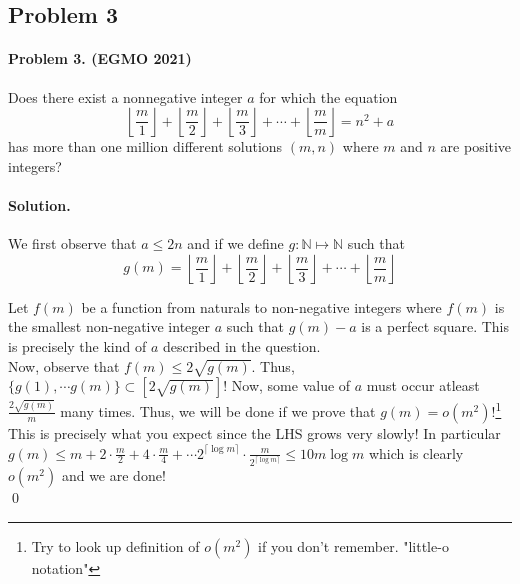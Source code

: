 \documentclass[12pt]{article}
\newenvironment{solution}
{\paragraph{Solution.}}
{\qed\eject}
\newcommand*{\NN}{\mathbb{N}}
\begin{document}
\subsection*{Problem 3}

\paragraph*{\textbf{Problem 3. (EGMO 2021)}} Does there exist a nonnegative integer $a$ for which the equation
\[\left\lfloor\frac{m}{1}\right\rfloor + \left\lfloor\frac{m}{2}\right\rfloor + \left\lfloor\frac{m}{3}\right\rfloor + \cdots + \left\lfloor\frac{m}{m}\right\rfloor = n^2 + a\]has more than one million different solutions $(m, n)$ where $m$ and $n$ are positive integers?

\begin{solution}
    We first observe that $a\le 2n$ and if we define $g:\NN\mapsto \NN$ such that \[g(m)=\left\lfloor\frac{m}{1}\right\rfloor + \left\lfloor\frac{m}{2}\right\rfloor + \left\lfloor\frac{m}{3}\right\rfloor + \cdots + \left\lfloor\frac{m}{m}\right\rfloor\]

    Let $f(m)$ be a function from naturals to non-negative integers where $f(m)$ is the smallest non-negative integer $a$ such that $g(m)-a$ is a perfect square. This is precisely the kind of $a$ described in the question.\\

    Now, observe that $f(m)\le 2\sqrt{g(m)}$. Thus, $\{g(1),\cdots g(m)\} \subset [2\sqrt{g(m)}]$! Now, some value of $a$ must occur atleast $\frac{2\sqrt{g(m)}}{m}$ many times. Thus, we will be done if we prove that $g(m)=o(m^2)$!\footnote{Try to look up definition of $o(m^2)$ if you don't remember. "little-o notation" }\\
    
    This is precisely what you expect since the LHS grows very slowly! In particular $g(m)\le m+2\cdot\frac{m}{2}+4\cdot\frac{m}{4}+\cdots 2^{\lceil \log m \rceil}\cdot\frac{m}{2^{\lceil \log m \rceil}}\le 10m\log m$ which is clearly $o(m^2)$ and we are done!\\


\end{solution}
\end{document}
